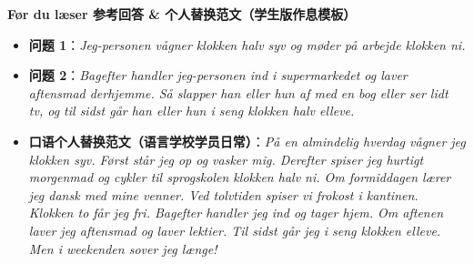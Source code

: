 \begin{answerbox}
\textbf{Før du læser 参考回答 \& 个人替换范文（学生版作息模板）}
\begin{itemize}
  \item \textbf{问题 1}：\textit{Jeg-personen vågner klokken halv syv og møder på arbejde klokken ni.}
  \item \textbf{问题 2}：\textit{Bagefter handler jeg-personen ind i supermarkedet og laver aftensmad derhjemme. Så slapper han eller hun af med en bog eller ser lidt tv, og til sidst går han eller hun i seng klokken halv elleve.}
  \item \textbf{口语个人替换范文（语言学校学员日常）}：\textit{På en almindelig hverdag vågner jeg klokken syv. Først står jeg op og vasker mig. Derefter spiser jeg hurtigt morgenmad og cykler til sprogskolen klokken halv ni. Om formiddagen lærer jeg dansk med mine venner. Ved tolvtiden spiser vi frokost i kantinen. Klokken to får jeg fri. Bagefter handler jeg ind og tager hjem. Om aftenen laver jeg aftensmad og laver lektier. Til sidst går jeg i seng klokken elleve. Men i weekenden sover jeg længe!}
\end{itemize}
\end{answerbox}
